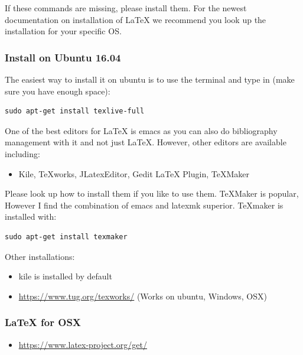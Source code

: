 If these commands are missing, please install them. For the newest
documentation on installation of LaTeX we recommend you look up the
installation for your specific OS.

\subsubsection{Install on Ubuntu 16.04}\label{install-on-ubuntu-16.04}

The easiest way to install it on ubuntu is to use the terminal and type
in (make sure you have enough space):

\begin{verbatim}
sudo apt-get install texlive-full
\end{verbatim}

One of the best editors for LaTeX is emacs as you can also do
bibliography management with it and not just LaTeX. However, other
editors are available including:

\begin{itemize}

\item
  Kile, TeXworks, JLatexEditor, Gedit LaTeX Plugin, TeXMaker
\end{itemize}

Please look up how to install them if you like to use them. TeXMaker is
popular, However I find the combination of emacs and latexmk superior.
TeXmaker is installed with:

\begin{verbatim}
sudo apt-get install texmaker
\end{verbatim}

Other installations:

\begin{itemize}

\item
  kile is installed by default
\item
  \url{https://www.tug.org/texworks/} (Works on ubuntu, Windows, OSX)
\end{itemize}

\subsubsection{LaTeX for OSX}\label{latex-for-osx}

\begin{itemize}

\item
  \url{https://www.latex-project.org/get/}
\end{itemize}

